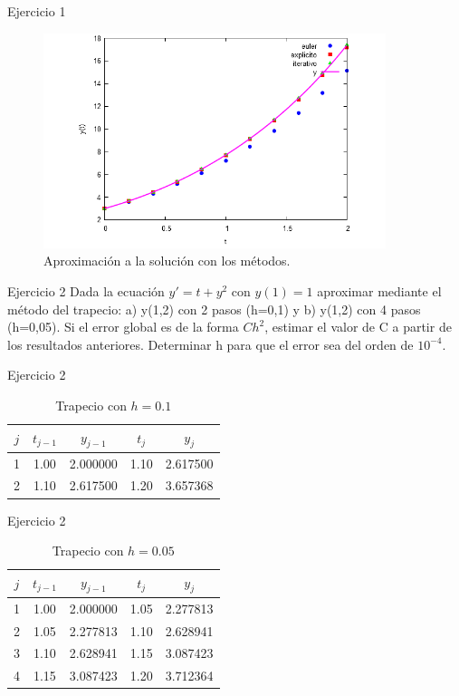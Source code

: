 		\begin{frame}{Ejercicio 1}
			\begin{figure}[h]
				\centering
				\includegraphics[width=10cm]{./Images/ejtp1-2.png}
				\caption{Aproximación a la solución con los métodos.}
			\end{figure}	
		\end{frame}
				
		\begin{frame}{Ejercicio 2}
			Dada la ecuación $y'=t+y^2$ con $y(1)=1$ aproximar mediante el método del trapecio: a) y(1,2) con 2 pasos (h=0,1) y b) y(1,2) con 4 pasos (h=0,05). Si el error global es de la forma $Ch^2$, estimar el valor de C a partir de los resultados anteriores. Determinar h para que el error sea del orden de $10^{-4}$.		
		\end{frame}
					
		\begin{frame}{Ejercicio 2}
			    \begin{table}[H]
			    	\centering
			    	\begin{tabular}{|| c | c | c | c | c ||}
			    		\hline
			    		\hline $j$ &  $t_{j-1}$ & $y_{j-1}$ & $t_j$ & $y_j$ \\
			    		\hline 1 & 1.00 & 2.000000 & 1.10 & 2.617500 \\
			    		\hline 2 & 1.10 & 2.617500 & 1.20 & 3.657368 \\
			    		\hline
			    		\hline
			    	\end{tabular}
			    	\caption{Trapecio con $h=0.1$}
			    \end{table}		
		\end{frame}
						
		\begin{frame}{Ejercicio 2}
				\begin{table}[H]
					\centering
				 	\begin{tabular}{|| c | c | c | c | c ||}
				 		\hline
				 		\hline $j$ &  $t_{j-1}$ & $y_{j-1}$ & $t_j$ & $y_j$ \\
				 		\hline 1 & 1.00 & 2.000000 & 1.05 & 2.277813 \\
				 		\hline 2 & 1.05 & 2.277813 & 1.10 & 2.628941 \\
				 		\hline 3 & 1.10 & 2.628941 & 1.15 & 3.087423 \\
				 		\hline 4 & 1.15 & 3.087423 & 1.20 & 3.712364 \\
				 		\hline
				 		\hline
				 	\end{tabular}
				 	\caption{Trapecio con $h=0.05$}
				 \end{table}						
		\end{frame}

